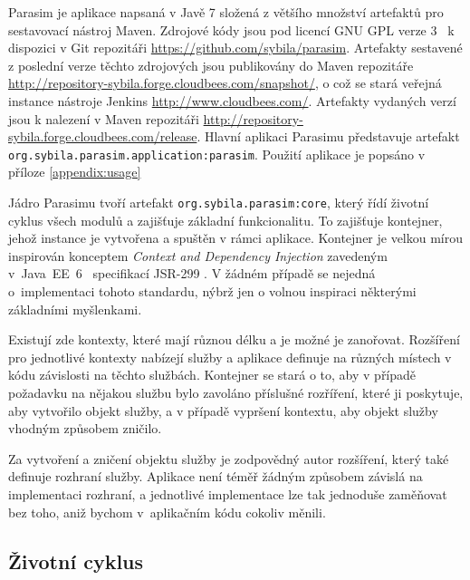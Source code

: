 Parasim je aplikace napsaná v Javě 7 složená z většího množství artefaktů pro
sestavovací nástroj Maven. Zdrojové kódy jsou pod licencí GNU GPL verze 3~\cite{gpl} k dispozici
v Git \cite{chacon2009} repozitáři \url{https://github.com/sybila/parasim}. Artefakty sestavené
z poslední verze těchto zdrojových jsou publikovány do Maven repozitáře
\url{http://repository-sybila.forge.cloudbees.com/snapshot/}, o což se stará veřejná
instance nástroje Jenkins \cite{jenkins} \url{http://www.cloudbees.com/}. Artefakty
vydaných verzí jsou k nalezení v Maven repozitáři \url{http://repository-sybila.forge.cloudbees.com/release}.
Hlavní aplikaci Parasimu představuje artefakt \texttt{org.sybila.parasim.application:parasim}.
Pou\-ži\-tí aplikace je popsáno v příloze \ref{appendix:usage}

Jádro Parasimu tvoří artefakt \texttt{org.sybila.parasim:core}, který řídí ži\-vot\-ní
cyklus všech modulů a zajišťuje základní funkcionalitu. To zajišťuje kontejner,
jehož instance je vytvořena a spuštěn v rámci aplikace. Kontejner je velkou mírou inspi\-ro\-ván
konceptem \textit{Context and Dependency Injection} zavedeným v~Java~EE~6~\cite{jendrock2010} specifikací
JSR-299 \cite{jsr299}. V žádném případě se nejedná o~implementaci tohoto standardu,
nýbrž jen o volnou inspiraci některými zá\-klad\-ní\-mi myšlenkami.

Existují zde kontexty, které mají různou délku a je možné je za\-no\-řo\-vat.
Rozšíření pro jednotlivé kontexty nabízejí služby a aplikace definuje na různých
místech v kódu závislosti na těchto službách. Kontejner se stará o to,
aby v případě požadavku na nějakou službu bylo zavoláno příslušné rozříření,
které ji poskytuje, aby vytvořilo objekt služby, a v případě vy\-pr\-še\-ní kontextu,
aby objekt služby vhodným způsobem zničilo.

Za vytvoření a zničení objektu služby je zodpovědný autor rozšíření, který také definuje rozhraní
služby. Aplikace není téměř žádným způsobem závislá na implementaci rozhraní,
a jednotlivé implementace lze tak jednoduše zaměňovat bez toho, aniž bychom
v~aplikačním kódu cokoliv měnili.


\subsection{Životní cyklus}

